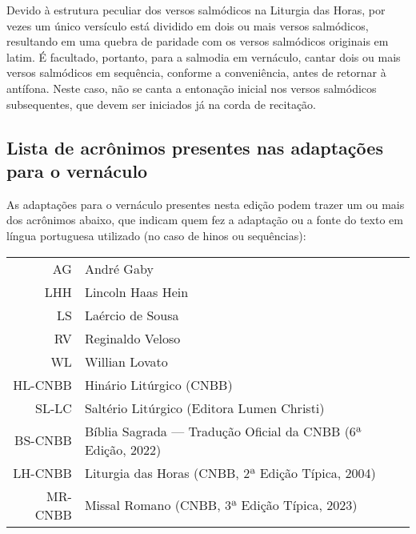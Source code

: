 Devido à estrutura peculiar dos versos salmódicos na Liturgia das Horas, por vezes um único versículo está dividido em dois ou mais versos salmódicos, resultando em uma quebra de paridade com os versos salmódicos originais em latim. É facultado, portanto, para a salmodia em vernáculo, cantar dois ou mais versos salmódicos em sequência, conforme a conveniência, antes de retornar à antífona. Neste caso, não se canta a entonação inicial nos versos salmódicos subsequentes, que devem ser iniciados já na corda de recitação.

\subsection{Lista de acrônimos presentes nas adaptações para o vernáculo}

As adaptações para o vernáculo presentes nesta edição podem trazer um ou mais dos acrônimos abaixo, que indicam quem fez a adaptação ou a fonte do texto em língua portuguesa utilizado (no caso de hinos ou sequências):

\begin{center}
  \begin{tabular}{rl}
    AG      & André Gaby                                                    \\
    LHH     & Lincoln Haas Hein                                             \\
    LS      & Laércio de Sousa                                              \\
    RV      & Reginaldo Veloso                                              \\
    WL      & Willian Lovato                                                \\
    HL-CNBB & Hinário Litúrgico (CNBB)                                      \\
    SL-LC   & Saltério Litúrgico (Editora Lumen Christi)                    \\
    BS-CNBB & Bíblia Sagrada --- Tradução Oficial da CNBB (6ª Edição, 2022) \\
    LH-CNBB & Liturgia das Horas (CNBB, 2ª Edição Típica, 2004)             \\
    MR-CNBB & Missal Romano (CNBB, 3ª Edição Típica, 2023)                  \\
  \end{tabular}
\end{center}

\AllowPageFlush


